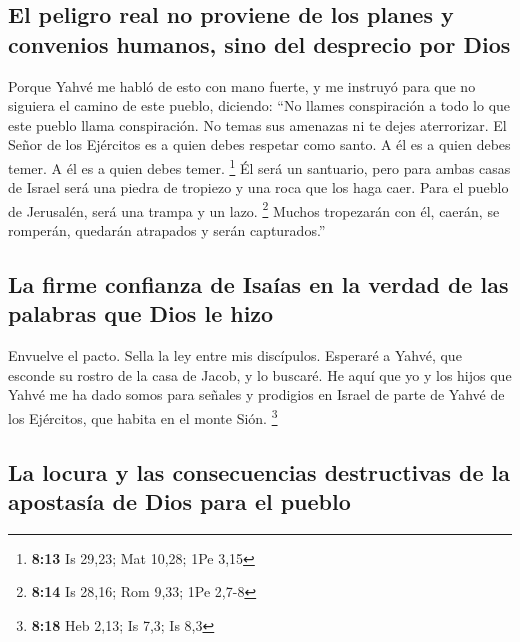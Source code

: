 \begin{paracol}{2}
\hypertarget{el-peligro-real-no-proviene-de-los-planes-y-convenios-humanos-sino-del-desprecio-por-dios}{%
\subsection{El peligro real no proviene de los planes y convenios
humanos, sino del desprecio por
Dios}\label{el-peligro-real-no-proviene-de-los-planes-y-convenios-humanos-sino-del-desprecio-por-dios}}

 Porque Yahvé me habló de esto con mano fuerte, y me
instruyó para que no siguiera el camino de este pueblo, diciendo:
 ``No llames conspiración a todo lo que este pueblo llama
conspiración. No temas sus amenazas ni te dejes aterrorizar.
 El Señor de los Ejércitos es a quien debes respetar como
santo. A él es a quien debes temer. A él es a quien debes temer.
\footnote{\textbf{8:13} Is 29,23; Mat 10,28; 1Pe 3,15} 
Él será un santuario, pero para ambas casas de Israel será una piedra de
tropiezo y una roca que los haga caer. Para el pueblo de Jerusalén, será
una trampa y un lazo. \footnote{\textbf{8:14} Is 28,16; Rom 9,33; 1Pe
  2,7-8}  Muchos tropezarán con él, caerán, se romperán,
quedarán atrapados y serán capturados.''

\hypertarget{la-firme-confianza-de-isauxedas-en-la-verdad-de-las-palabras-que-dios-le-hizo}{%
\subsection{La firme confianza de Isaías en la verdad de las palabras
que Dios le
hizo}\label{la-firme-confianza-de-isauxedas-en-la-verdad-de-las-palabras-que-dios-le-hizo}}

 Envuelve el pacto. Sella la ley entre mis discípulos.
 Esperaré a Yahvé, que esconde su rostro de la casa de
Jacob, y lo buscaré.  He aquí que yo y los hijos que
Yahvé me ha dado somos para señales y prodigios en Israel de parte de
Yahvé de los Ejércitos, que habita en el monte Sión. \footnote{\textbf{8:18}
  Heb 2,13; Is 7,3; Is 8,3}

\hypertarget{la-locura-y-las-consecuencias-destructivas-de-la-apostasuxeda-de-dios-para-el-pueblo}{%
\subsection{La locura y las consecuencias destructivas de la apostasía
de Dios para el
pueblo}\label{la-locura-y-las-consecuencias-destructivas-de-la-apostasuxeda-de-dios-para-el-pueblo}}


\end{paracol}
